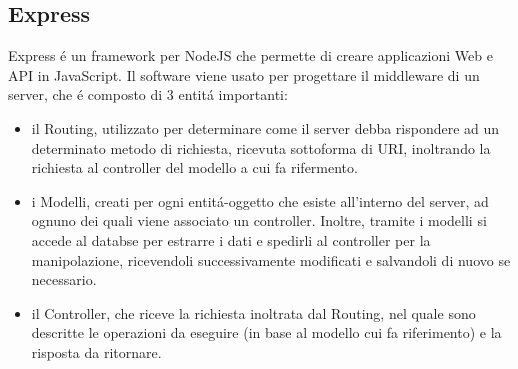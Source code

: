 \subsection{Express}
Express \'e un framework per NodeJS che permette di creare applicazioni Web e API in JavaScript.
Il software viene usato per progettare il middleware di un server, che \'e composto di 3 entit\'a importanti:
\begin{itemize}
\item il Routing, utilizzato per determinare come il server debba rispondere ad un determinato metodo di richiesta,
ricevuta sottoforma di URI, inoltrando la richiesta al controller del modello a cui fa rifermento.
\item i Modelli, creati per ogni entit\'a-oggetto che esiste all'interno del server, ad ognuno dei quali viene associato
un controller. Inoltre, tramite i modelli si accede al databse per estrarre i dati e spedirli al controller per
la manipolazione, ricevendoli successivamente modificati e salvandoli di nuovo se necessario.
\item il Controller, che riceve la richiesta inoltrata dal Routing, nel quale sono descritte le operazioni da eseguire
(in base al modello cui fa riferimento) e la risposta da ritornare.
\\[2\baselineskip]
\end{itemize}

